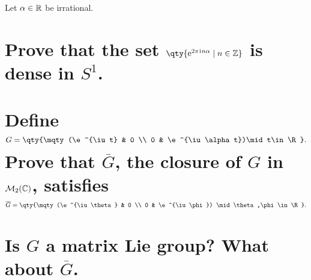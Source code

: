 \documentclass[
	pages,
	boxes,
	color=WildStrawberry
]{homework}
\begin{document}
\begin{problem}
Let $\alpha\in\mathbb{R}$ be irrational.
\begin{parts}
	\part{Prove that the set $\qty{\e^{2\pi\iu n\alpha}\mid n\in\Z}$ is dense in $S^1$.}\label{part:2a}
	\part{Define \[G = \qty{\mqty(\e^{\iu t} & 0 \\ 0 & \e^{\iu\alpha t})\mid t\in\R}.\] Prove that $\overline{G}$, the closure of $G$ in $\mathcal{M}_{2}(\mathbb{C})$, satisfies \[\overline{G} = \qty{\mqty(\e^{\iu\theta} & 0 \\ 0 & \e^{\iu\phi}) \mid \theta,\phi\in\R}.\]}\label{part:2b}
	\part{Is $G$ a matrix Lie group? What about $\overline{G}$.}\label{part:2c}
\end{parts}
\end{problem}
\end{document}
